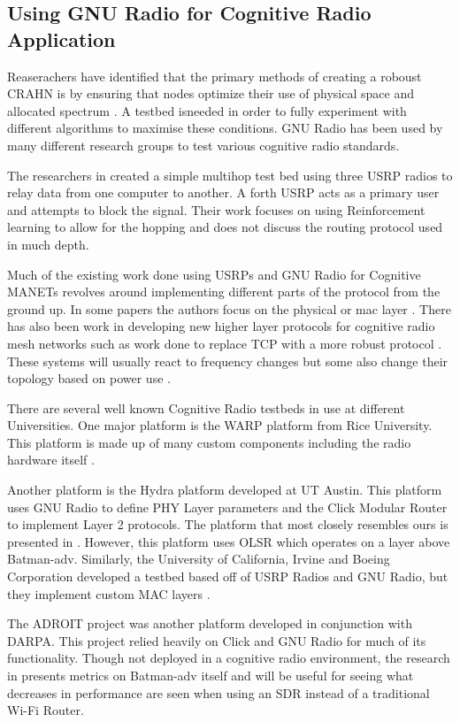 \subsection{Using GNU Radio for Cognitive Radio Application}

Reaserachers have identified that the primary methods of creating a roboust CRAHN is by ensuring that nodes optimize their use of physical space and allocated spectrum \cite{6846075}. A testbed isneeded in order to fully experiment with different algorithms to maximise these conditions. GNU Radio has been used by many different research groups to test various cognitive radio
standards. 

The researchers in \cite{7141228} created a simple multihop test bed using three USRP radios to relay data from one computer to another. A forth USRP acts as a primary user and attempts to block the signal. Their work focuses on using Reinforcement learning to allow for the hopping and does not discuss the routing protocol used in much depth. 

Much of the existing work done using USRPs and GNU Radio for Cognitive MANETs revolves around implementing different parts of the protocol from the ground up. In some papers the authors focus on the physical or mac layer \cite{5508221}. There has also been work in developing new higher layer protocols for cognitive radio mesh networks such as work done to replace TCP with a more robust protocol \cite{6686523}. These systems will usually react to frequency changes but some also change their topology based on power use \cite{6983150}. 

There are several well known Cognitive Radio testbeds in use at different Universities. One major platform is the WARP platform from Rice University. This platform is made up of many custom components including the radio hardware itself \cite{7071706}. 

Another platform is the Hydra platform developed at UT Austin. This platform uses GNU Radio to define PHY Layer parameters and the Click Modular Router to implement Layer 2 protocols.\cite{4212821} The platform that most closely resembles ours is presented in \cite{0002}. However, this platform uses OLSR which operates on a layer above Batman-adv. Similarly, the University of California, Irvine and Boeing Corporation developed a testbed based off of USRP Radios and GNU Radio, but they implement custom MAC layers \cite{4753441}. 

The ADROIT project was another platform developed in conjunction with DARPA. This project relied heavily on Click and GNU Radio for much of its functionality. \cite{4286321} Though not deployed in a cognitive radio environment, the research in \cite{6115569} presents metrics on Batman-adv itself and will be useful for seeing what decreases in performance are seen when using an SDR instead of a traditional Wi-Fi Router. 
